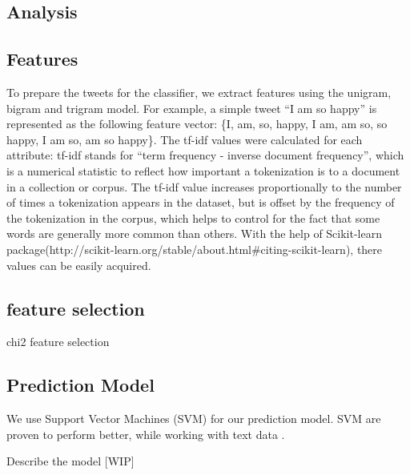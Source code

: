 \documentclass[11pt]{article}
\begin{document}
\subsection{Analysis}



\subsection{Features}

To prepare the tweets for the classifier, we extract features using the unigram, bigram and trigram model. For example, a simple tweet ``I am so happy'' is represented as the following feature vector: \{I, am, so, happy, I am, am so, so happy, I am so, am so happy\}. The tf-idf values were calculated for each attribute: tf-idf stands for ``term frequency - inverse document frequency'', which is a numerical statistic to reflect how important a tokenization is to a document in a collection or corpus. The tf-idf value increases proportionally to the number of times a tokenization appears in the dataset, but is offset by the frequency of the tokenization in the corpus, which helps to control for the fact that some words are generally more common than others. With the help of Scikit-learn package(http://scikit-learn.org/stable/about.html\#citing-scikit-learn), there values can be easily acquired. 

\subsection{feature selection}
chi2 feature selection

\subsection{Prediction Model}

We use Support Vector Machines (SVM) for our prediction model. SVM are proven to perform better, while working with text data \cite{svmJoachims}.

Describe the model [WIP]
\end{document}
